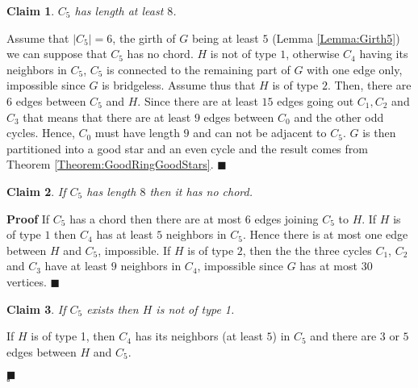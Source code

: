 \documentclass{elsart}
\theoremstyle{plain} \theoremheaderfont{\scshape}
\newtheorem{Clm}{Claim}[Thm]
\newenvironment{Prf}{{\bf \noindent Proof } }{\hfill$\square$\\}
\newenvironment{PrfClaim}{{\bf Proof }}{{\hfill\tiny{$\blacksquare$\\}}}
\begin{document}
\begin{Prf}
\begin{Clm} \label{Claim:Claim2_1_MinimumCounterExample32}
$C_5$ has length at least $8$.
\end{Clm}
\begin{PrfClaim}
Assume that $|C_5|=6$, the girth of $G$ being at least $5$ (Lemma
\ref{Lemma:Girth5}) we can suppose that $C_5$ has no chord. $H$ is
not of type $1$, otherwise $C_4$ having its neighbors in $C_5$,
$C_5$ is connected to the remaining part of $G$ with one edge only,
impossible since $G$ is bridgeless. Assume thus that $H$ is of type
$2$. Then, there are $6$ edges between $C_5$ and $H$. Since there
are at least $15$ edges going out $C_1,C_2$ and $C_3$ that means
that there are at least $9$ edges between $C_0$ and the other odd
cycles. Hence, $C_0$ must have length $9$ and can not be adjacent to
$C_5$. $G$ is then partitioned into a good star and an even cycle
and the result comes from Theorem \ref{Theorem:GoodRingGoodStars}.
\end{PrfClaim}

\begin{Clm} \label{Claim:Claim2_2_MinimumCounterExample32}
If $C_5$ has length $8$ then it has no chord.
\end{Clm}
\begin{PrfClaim} If $C_5$ has a chord then there are at most $6$
edges joining $C_5$ to $H$. If $H$ is of type $1$ then $C_4$ has at
least $5$ neighbors in $C_5$. Hence there is at most one edge
between $H$ and $C_5$, impossible. If $H$ is of type $2$, then the
the three cycles $C_1$, $C_2$ and $C_3$ have at least $9$ neighbors
in $C_4$, impossible since $G$ has at most $30$ vertices.
\end{PrfClaim}


\begin{Clm} \label{Claim:Claim3MinimumCounterExample32}
If $C_5$ exists then $H$ is not of type 1.
\end{Clm}
\begin{PrfClaim}
If $H$ is of type 1, then $C_4$ has its neighbors (at least $5$) in
$C_5$ and there are $3$ or $5$ edges between $H$ and $C_5$.










\end{PrfClaim}
\end{Prf}
\end{document}
